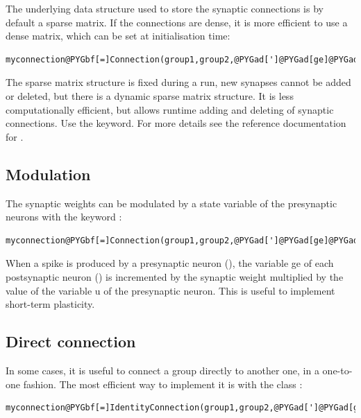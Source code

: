 \documentclass[letterpaper,10pt,english]{manual}
\begin{document}
The underlying data structure used to store the synaptic connections is by default a sparse
matrix. If the connections are dense, it is more efficient to use a dense matrix, which can be
set at initialisation time:

\begin{Verbatim}[commandchars=@\[\]]
myconnection@PYGbf[=]Connection(group1,group2,@PYGad[']@PYGad[ge]@PYGad['],structure@PYGbf[=]@PYGad[']@PYGad[dense]@PYGad['])
\end{Verbatim}

The sparse matrix structure is fixed during a run, new synapses cannot be added or deleted,
but there is a dynamic sparse matrix structure. It is less computationally efficient, but
allows runtime adding and deleting of synaptic connections. Use the 
keyword. For more details see the reference documentation for \hyperlink{brian.Connection}{}.


\subsection{Modulation}

The synaptic weights can be modulated by a state variable of the presynaptic neurons with
the keyword :

\begin{Verbatim}[commandchars=@\[\]]
myconnection@PYGbf[=]Connection(group1,group2,@PYGad[']@PYGad[ge]@PYGad['],modulation@PYGbf[=]@PYGad[']@PYGad[u]@PYGad['])
\end{Verbatim}

When a spike is produced by a presynaptic neuron (), the variable ge of each postsynaptic
neuron () is incremented by the synaptic weight multiplied by the value of the variable u
of the presynaptic neuron. This is useful to implement short-term plasticity.


\subsection{Direct connection}

In some cases, it is useful to connect a group directly to another one, in a one-to-one fashion.
The most efficient way to implement it is with the class \hyperlink{brian.IdentityConnection}{}:

\begin{Verbatim}[commandchars=@\[\]]
myconnection@PYGbf[=]IdentityConnection(group1,group2,@PYGad[']@PYGad[ge]@PYGad['],weight@PYGbf[=]@PYGaw[1]@PYGbf[*]nS)
\end{Verbatim}
\end{document}
